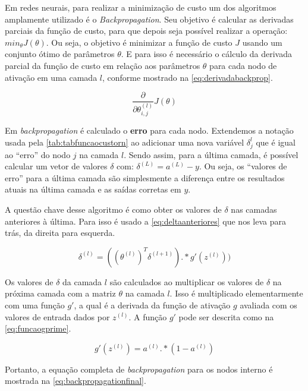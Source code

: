 Em redes neurais, para realizar a minimização de custo um dos algoritmos amplamente utilizado é o \textit{Backpropagation}. Seu objetivo é calcular as derivadas parciais da função de custo, para que depois seja possível realizar a operação: $min_{\theta}J(\theta)$. Ou seja, o objetivo é minimizar a função de custo $J$ usando um conjunto ótimo de parâmetros $\theta$. E para isso é necessário o cálculo da derivada parcial da função de custo em relação aos parâmetros $\theta$ para cada nodo de ativação em uma camada $l$, conforme mostrado na \autoref{eq:derivadabackprop}.

\begin{equation}\label{eq:derivadabackprop}
\frac{\partial}{\partial\theta_{i,j}^{(l)}} J(\theta)
\end{equation}


Em \textit{backpropagation} é calculado o \textbf{erro} para cada nodo. Extendemos a notação usada pela \autoref{tab:tabfuncaocustorn} ao adicionar uma nova variável $\delta_j^{l}$ que é igual ao ``erro'' do nodo $j$ na camada $l$. Sendo assim, para a última camada, é possível calcular um vetor de valores $\delta$ com: $\delta^{(L)} = a^{(L)} - y$. Ou seja, os ``valores de erro'' para a última camada são simplesmente a diferença entre os resultados atuais na última camada e as saídas corretas em $y$.

A questão chave desse algoritmo é como obter os valores de $\delta$ nas camadas anteriores à última. Para isso é usado a \autoref{eq:deltaanteriores} que nos leva para trás, da direita para esquerda.

\begin{equation}\label{eq:deltaanteriores}
\delta^{(l)} = ((\theta^{(l)})^T \delta^{(l+1)}) .* g'(z^{(l)}))
\end{equation}

Os valores de $\delta$ da camada $l$ são calculados ao multiplicar os valores de $\delta$ na próxima camada com a matriz $\theta$ na camada $l$. Isso é multiplicado elementarmente com uma função $g'$, a qual é a derivada da função de ativação $g$ avaliada com os valores de entrada dados por $z^{(l)}$. A função $g'$ pode ser descrita como na \autoref{eq:funcaogprime}.

\begin{equation}\label{eq:funcaogprime}
g'(z^{(l)}) = a^{(l)} .* (1 - a^{(l)}) 
\end{equation}

Portanto, a equação completa de \textit{backpropagation} para os nodos interno é mostrada na \autoref{eq:backpropagationfinal}.

